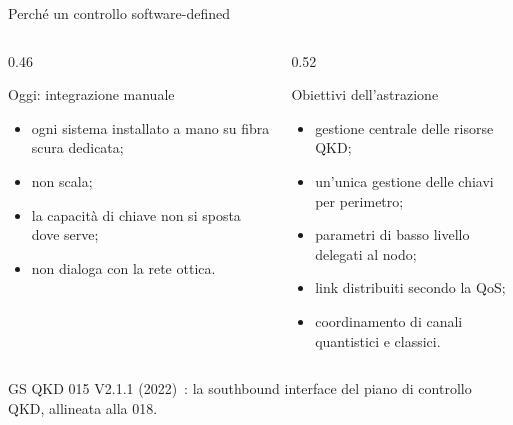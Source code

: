 \documentclass[10pt]{beamer}
\begin{document}
\begin{frame}{Perché un controllo software-defined}
  \begin{columns}[T]
    \begin{column}{0.46\textwidth}
      \begin{alertblock}{Oggi: integrazione manuale}
        \begin{itemize}
          \item ogni sistema installato a mano su fibra scura dedicata;
          \item non scala;
          \item la capacità di chiave non si sposta dove serve;
          \item non dialoga con la rete ottica.
        \end{itemize}
      \end{alertblock}
    \end{column}
    \begin{column}{0.52\textwidth}
      \begin{block}{Obiettivi dell'astrazione}
        \begin{itemize}
          \item gestione centrale delle risorse QKD;
          \item un'unica gestione delle chiavi per perimetro;
          \item parametri di basso livello delegati al nodo;
          \item link distribuiti secondo la QoS;
          \item coordinamento di canali quantistici e classici.
        \end{itemize}
      \end{block}
    \end{column}
  \end{columns}
  \vspace{1ex}
  \centering\small GS QKD 015 V2.1.1 (2022)~\cite{qkd015}: la \alert{southbound
  interface} del piano di controllo QKD, allineata alla 018.
\end{frame}
\end{document}
